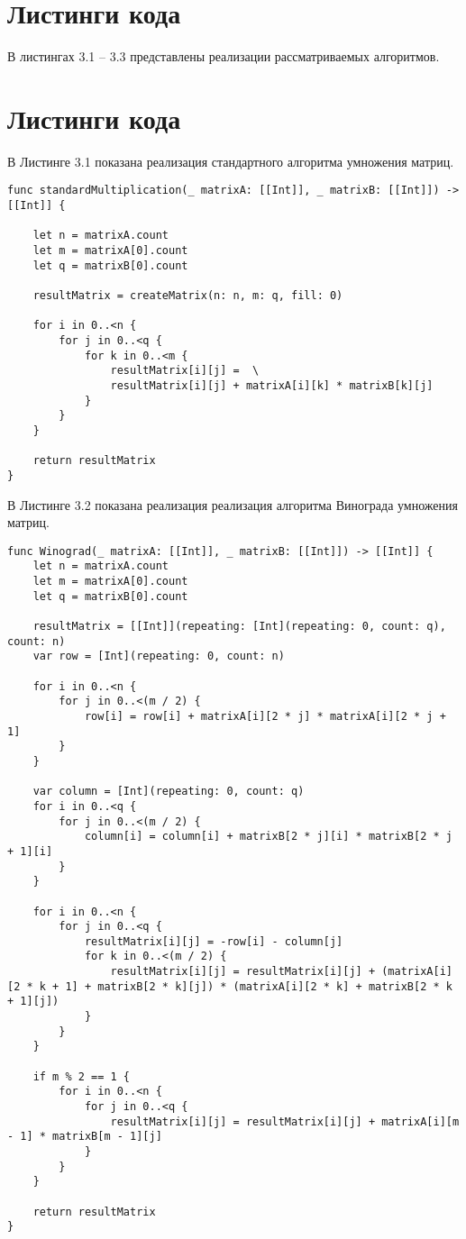 \section{Листинги кода}

В листингах 3.1 -- 3.3 представлены реализации рассматриваемых алгоритмов.

\section{Листинги кода}


\hspace{0.6cm}В Листинге 3.1 показана реализация стандартного алгоритма умножения матриц.
\begin{lstlisting}[caption=Функция стандартного умножения матриц]
func standardMultiplication(_ matrixA: [[Int]], _ matrixB: [[Int]]) -> [[Int]] {

    let n = matrixA.count
    let m = matrixA[0].count
    let q = matrixB[0].count
    
    resultMatrix = createMatrix(n: n, m: q, fill: 0)
    
    for i in 0..<n {
        for j in 0..<q {
            for k in 0..<m {
                resultMatrix[i][j] =  \
                resultMatrix[i][j] + matrixA[i][k] * matrixB[k][j]
            }
        }
    }
    
    return resultMatrix
}
\end{lstlisting}





\hspace{0.6cm}В Листинге 3.2 показана реализация реализация алгоритма Винограда умножения матриц.
\begin{lstlisting}[caption=Функция алгоритма Винограда умножения матриц]
func Winograd(_ matrixA: [[Int]], _ matrixB: [[Int]]) -> [[Int]] {
    let n = matrixA.count
    let m = matrixA[0].count
    let q = matrixB[0].count
    
    resultMatrix = [[Int]](repeating: [Int](repeating: 0, count: q), count: n)
    var row = [Int](repeating: 0, count: n)
    
    for i in 0..<n {
        for j in 0..<(m / 2) {
            row[i] = row[i] + matrixA[i][2 * j] * matrixA[i][2 * j + 1]
        }
    }
    
    var column = [Int](repeating: 0, count: q)
    for i in 0..<q {
        for j in 0..<(m / 2) {
            column[i] = column[i] + matrixB[2 * j][i] * matrixB[2 * j + 1][i]
        }
    }
    
    for i in 0..<n {
        for j in 0..<q {
            resultMatrix[i][j] = -row[i] - column[j]
            for k in 0..<(m / 2) {
                resultMatrix[i][j] = resultMatrix[i][j] + (matrixA[i][2 * k + 1] + matrixB[2 * k][j]) * (matrixA[i][2 * k] + matrixB[2 * k + 1][j])
            }
        }
    }
    
    if m % 2 == 1 {
        for i in 0..<n {
            for j in 0..<q {
                resultMatrix[i][j] = resultMatrix[i][j] + matrixA[i][m - 1] * matrixB[m - 1][j]
            }
        }
    }
    
    return resultMatrix
}
\end{lstlisting}

